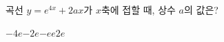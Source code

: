 곡선 $y=e^{4x}+2ax$가 $x$축에 접할 때, 상수 $a$의 값은?
\begin{choices32}{$-4e$}{$-2e$}{$-e$}{$e$}{$2e$}\end{choices32}
